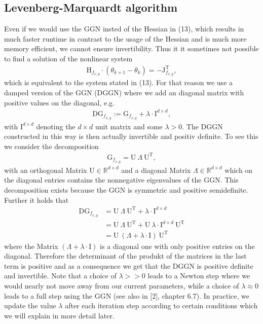 \documentclass[conference]{IEEEtran}
\begin{document}
\subsection{Levenberg-Marquardt algorithm }
Even if we would use the GGN insted of the Hessian in (13), which results in much faster runtime in contrast to the usage of the Hessian and is much more memory efficient, we cannot ensure invertibility. Thus it it sometimes not possible to find a solution of the nonlinear system
\begin{align}
\mathrm{H}_{f_{x, y}}\cdot(\theta_{k+1} - \theta_{k}) = -\mathrm{J}_{f_{x, y}}^{\mathrm{T}},
\end{align}
which is equivalent to the system stated in (13).
For that reason we use a damped version of the GGN (DGGN) where we add an diagonal matrix with positive values on the diagonal, e.g.
\begin{align}
\mathrm{DG}_{f_{x, y}} := \mathrm{G}_{f_{x, y}} + \lambda\cdot\mathrm{I}^{d\times d},
\end{align}
with $\mathrm{I}^{d\times d}$ denoting the $d\times d$ unit matrix and some $\lambda>0$.
The DGGN constructed in this way is then actually invertible and positiv definite. 
To see this we consider the decomposition
\begin{align}
\mathrm{G}_{f_{x, y}} = \mathrm{U}\:\Lambda\:\mathrm{U}^{\mathrm{T}},
\end{align}
with an orthogonal Matrix $\mathrm{U}\in\mathbb{R}^{d\times d}$ and a diagonal Matrix $\Lambda\in\mathbb{R}^{d\times d}$ which on the diagonal entries contains the nonnegative eigenvalues of the GGN. This decomposition exists because the GGN is symmetric and positive semidefinite. Further it holds that
\begin{align}
\mathrm{DG}_{f_{x, y}} &= \mathrm{U}\:\Lambda\:\mathrm{U}^{\mathrm{T}} + \lambda\cdot\mathrm{I}^{d\times d}\\
&= \mathrm{U}\:\Lambda\:\mathrm{U}^{\mathrm{T}} + \mathrm{U}\:\lambda\cdot\mathrm{I}^{d\times d}\:\mathrm{U}^{\mathrm{T}}\\
&= \mathrm{U}\:\left(\Lambda + \lambda\cdot\mathrm{I}\right)\:\mathrm{U}^{\mathrm{T}}
\end{align}
where the Matrix $\left(\Lambda + \lambda\cdot\mathrm{I}\right)$ is a diagonal one with only positive entries on the diagonal. Therefore the determinant of the produkt of the matrices in the last term is positive and as a consequence we get that the DGGN is positive definite and invertible.
Note that a choice of $\lambda>>0$ leads to a Newton step where we would nearly not move away from our current parameters, while a choice of $\lambda\approx 0$ leads to a full step using the GGN (see also in [2], chapter 6.7). In practice, we update the value $\lambda$ after each iteration step according to certain conditions which we will explain in more detail later.
\end{document}
